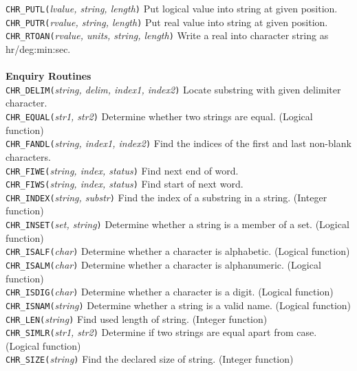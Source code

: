\begin{tabbing}
 {{\tt{CHR\_PUTL(}}{\em lvalue, string, length}{\tt )}}\>
 Put logical value into string at given position.\\
 {{\tt{CHR\_PUTR(}}{\em rvalue, string, length}{\tt )}}\>
 Put real value into string at given position.\\
 {{\tt{CHR\_RTOAN(}}{\em rvalue, units, string, length}{\tt )}}\>
 Write a real into character string as hr/deg:min:sec.\\
\\
{\bf Enquiry Routines}\\
 {{\tt{CHR\_DELIM(}}{\em string, delim, index1, index2}{\tt )}} \>
 Locate substring with given delimiter character.\\
 {{\tt{CHR\_EQUAL(}}{\em str1, str2}{\tt )}}\>
 Determine whether two strings are equal. (Logical function)\\
 {{\tt{CHR\_FANDL(}}{\em string, index1, index2}{\tt )}}\>
 Find the indices of the first and last non-blank characters.\\
 {{\tt{CHR\_FIWE(}}{\em string, index, status}{\tt )}}\>
 Find next end of word.\\
 {{\tt{CHR\_FIWS(}}{\em string, index, status}{\tt )}}\>
 Find start of next word.\\
 {{\tt{CHR\_INDEX(}}{\em string, substr}{\tt )}}\>
 Find the index of a substring in a string. (Integer function)\\
 {{\tt{CHR\_INSET(}}{\em set, string}{\tt )}}\>
 Determine whether a string is a member of a set. (Logical function)\\
 {{\tt{CHR\_ISALF(}}{\em char}{\tt )}}\>
 Determine whether a character is alphabetic. (Logical function)\\
 {{\tt{CHR\_ISALM(}}{\em char}{\tt )}}\>
 Determine whether a character is alphanumeric. (Logical function)\\
 {{\tt{CHR\_ISDIG(}}{\em char}{\tt )}}\>
 Determine whether a character is a digit. (Logical function)\\
 {{\tt{CHR\_ISNAM(}}{\em string}{\tt )}}\>
 Determine whether a string is a valid name. (Logical function)\\
 {{\tt{CHR\_LEN(}}{\em string}{\tt )}}\>
 Find used length of string. (Integer function)\\
 {{\tt{CHR\_SIMLR(}}{\em str1, str2}{\tt )}}\>
 Determine if two strings are equal apart from case. (Logical function)\\
 {{\tt{CHR\_SIZE(}}{\em string}{\tt )}}\>
 Find the declared size of string. (Integer function)\\

\end{tabbing}
